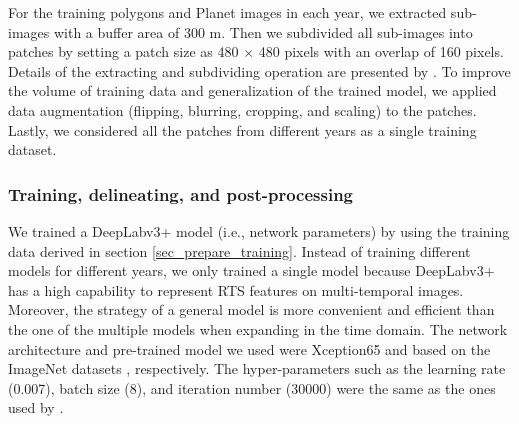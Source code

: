 \documentclass[authoryear,preprint,review,12pt]{elsarticle}
\begin{document}
For the training polygons and Planet images in each year, we extracted sub-images with a buffer area of 300 m. 
Then we subdivided all sub-images into patches by setting a patch size as 480 $\times$ 480 pixels with an overlap of 160 pixels. 
Details of the extracting and subdividing operation are presented by \cite{huang2018automatic}.
To improve the volume of training data and generalization of the trained model, we applied data augmentation (flipping, blurring, cropping, and scaling) to the patches. 
Lastly, we considered all the patches from different years as a single training dataset. 



\subsubsection{Training, delineating, and post-processing}
\label{sec_train_deli_post_pro}

We trained a DeepLabv3+ model (i.e., network parameters) by using the training data derived in section \ref{sec_prepare_training}. 
Instead of training different models for different years, we only trained a single model because DeepLabv3+ has a high capability to represent RTS features on multi-temporal images. 
Moreover, the strategy of a general model is more convenient and efficient than the one of the multiple models when expanding in the time domain. %
The network architecture and pre-trained model we used were Xception65 \citep{chollet2017xception} and based on the ImageNet datasets \citep{russakovsky2015imagenet}, respectively. 
The hyper-parameters such as the learning rate (0.007), batch size (8), and iteration number (30000) were the same as the ones used by \cite{huang2020using}.

\end{document}
